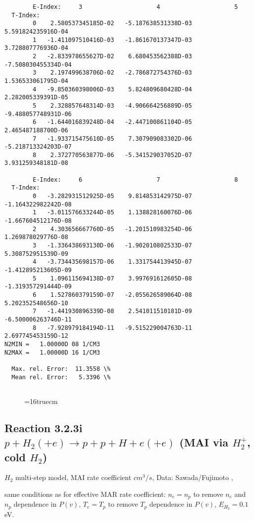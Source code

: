 \documentclass[12pt,dvipdfmx]{article}
\begin{document}
{\begin{small}
\begin{verbatim}
        E-Index:     3                     4                     5
  T-Index:
        0    2.580537345185D-02   -5.187638531338D-03    5.591824235916D-04
        1   -1.411097510416D-03   -1.861670137347D-03    3.728807776936D-04
        2   -2.833978655627D-02    6.680453562388D-03   -7.508030455334D-04
        3    2.197499638706D-02   -2.786872754376D-03    1.536533061795D-04
        4   -9.850360398006D-03    5.824809680428D-04    2.282005339391D-05
        5    2.328857648314D-03   -4.906664256889D-05   -9.488057748931D-06
        6   -1.644016839248D-04   -2.447100861104D-05    2.465487188700D-06
        7   -1.933715475610D-05    7.307909083302D-06   -5.218713324203D-07
        8    2.372770563877D-06   -5.341529037052D-07    3.931259348181D-08

        E-Index:     6                     7                     8
  T-Index:
        0   -3.282931512925D-05    9.814853142975D-07   -1.164322982242D-08
        1   -3.011576633244D-05    1.138828160076D-06   -1.667604512176D-08
        2    4.303656667760D-05   -1.201510983254D-06    1.269878029776D-08
        3   -1.336438693130D-06   -1.902010802533D-07    5.308752951539D-09
        4   -3.734435698157D-06    1.331754413945D-07   -1.412895213605D-09
        5    1.096115694138D-07    3.997691612605D-08   -1.319357291444D-09
        6    1.527860379159D-07   -2.055626589064D-08    5.202352548656D-10
        7   -1.441930896339D-08    2.541011510181D-09   -6.500006263746D-11
        8   -7.928979184194D-11   -9.515229004763D-11    2.697745453159D-12
N2MIN =   1.00000D 08 1/CM3
N2MAX =   1.00000D 16 1/CM3

  Max. rel. Error:  11.3558 \%
  Mean rel. Error:   5.3396 \%


\end{verbatim}\end{small}
\begin{figure} \label{2.2.5mad}
\epsfxsize=16truecm
\end{figure}
\newpage

\subsection{
Reaction 3.2.3i   $p + H_2 (+e)  \rightarrow p + p + H +e (+e) $ (MAI via $H_2^+$, cold $H_2$)
}

$H_2$ multi-step model, MAI rate coefficient $cm^3/s$,
 Data: Sawada/Fujimoto ,\cite{kn:Sawada}

same conditions as for effective MAR rate coefficient: $n_e=n_p$ to remove $n_e$ and $n_p$ dependence in $P(v)$,
$T_e=T_p$ to remove $T_p$ dependence in $P(v)$,  $E_{H_2}=0.1$ eV.



}
\end{document}
